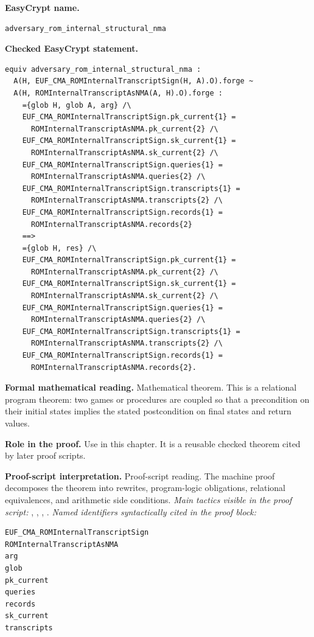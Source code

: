 \begin{formaltheorem}
\noindent\textbf{EasyCrypt name.}
\begin{lstlisting}[language=EasyCrypt,basicstyle=\ttfamily\scriptsize]
adversary_rom_internal_structural_nma
\end{lstlisting}
\noindent\textbf{Checked EasyCrypt statement.}
\begin{lstlisting}[language=EasyCrypt,basicstyle=\ttfamily\scriptsize]
equiv adversary_rom_internal_structural_nma :
  A(H, EUF_CMA_ROMInternalTranscriptSign(H, A).O).forge ~
  A(H, ROMInternalTranscriptAsNMA(A, H).O).forge :
    ={glob H, glob A, arg} /\
    EUF_CMA_ROMInternalTranscriptSign.pk_current{1} =
      ROMInternalTranscriptAsNMA.pk_current{2} /\
    EUF_CMA_ROMInternalTranscriptSign.sk_current{1} =
      ROMInternalTranscriptAsNMA.sk_current{2} /\
    EUF_CMA_ROMInternalTranscriptSign.queries{1} =
      ROMInternalTranscriptAsNMA.queries{2} /\
    EUF_CMA_ROMInternalTranscriptSign.transcripts{1} =
      ROMInternalTranscriptAsNMA.transcripts{2} /\
    EUF_CMA_ROMInternalTranscriptSign.records{1} =
      ROMInternalTranscriptAsNMA.records{2}
    ==>
    ={glob H, res} /\
    EUF_CMA_ROMInternalTranscriptSign.pk_current{1} =
      ROMInternalTranscriptAsNMA.pk_current{2} /\
    EUF_CMA_ROMInternalTranscriptSign.sk_current{1} =
      ROMInternalTranscriptAsNMA.sk_current{2} /\
    EUF_CMA_ROMInternalTranscriptSign.queries{1} =
      ROMInternalTranscriptAsNMA.queries{2} /\
    EUF_CMA_ROMInternalTranscriptSign.transcripts{1} =
      ROMInternalTranscriptAsNMA.transcripts{2} /\
    EUF_CMA_ROMInternalTranscriptSign.records{1} =
      ROMInternalTranscriptAsNMA.records{2}.
\end{lstlisting}
\noindent\textbf{Formal mathematical reading.}
Mathematical theorem. This is a relational program theorem: two games or procedures are coupled so that a precondition on their initial states implies the stated postcondition on final states and return values.

\noindent\textbf{Role in the proof.}
Use in this chapter. It is a reusable checked theorem cited by later proof scripts.

\noindent\textbf{Proof-script interpretation.}
Proof-script reading. The machine proof decomposes the theorem into rewrites, program-logic obligations, relational equivalences, and arithmetic side conditions.
\emph{Main tactics visible in the proof script:} , , , .
\emph{Named identifiers syntactically cited in the proof block:}
\begin{lstlisting}[language=EasyCrypt,basicstyle=\ttfamily\scriptsize]
EUF_CMA_ROMInternalTranscriptSign
ROMInternalTranscriptAsNMA
arg
glob
pk_current
queries
records
sk_current
transcripts
\end{lstlisting}

\end{formaltheorem}

